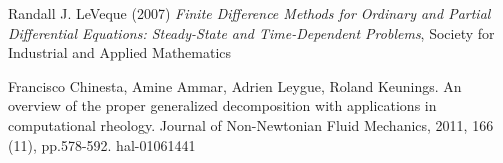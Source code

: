 \documentclass{article}
\begin{document}
\begin{thebibliography}{9}
Randall J. LeVeque (2007) \emph{Finite Difference Methods for Ordinary and Partial Differential Equations:
Steady-State and Time-Dependent Problems}, Society for Industrial and Applied Mathematics 

Francisco Chinesta, Amine Ammar, Adrien Leygue, Roland Keunings. An overview of the proper generalized decomposition with applications in computational rheology. Journal of Non-Newtonian Fluid Mechanics, 2011, 166 (11), pp.578-592. hal-01061441
\end{thebibliography}
\end{document}
